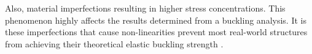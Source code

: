 Also, material imperfections resulting in higher stress concentrations. This phenomenon highly affects the results determined from a buckling analysis. It is these imperfections that cause non-linearities prevent most real-world structures from achieving their theoretical elastic buckling strength \cite{ANSYS}.


